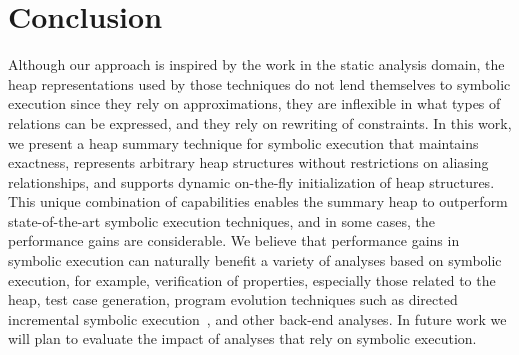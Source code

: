 \section{Conclusion}


Although our approach is inspired by the work in the static analysis
domain, the heap representations used by those techniques do not lend
themselves to symbolic execution since they rely on approximations,
they are inflexible in what types of relations can be expressed, and
they rely on rewriting of constraints.  In this work, we present a
heap summary technique for symbolic execution that maintains
exactness, represents arbitrary heap structures without restrictions
on aliasing relationships, and supports dynamic on-the-fly
initialization of heap structures. This unique combination of
capabilities enables the summary heap to outperform state-of-the-art
symbolic execution techniques, and in some cases, the performance
gains are considerable. We believe that performance gains in symbolic
execution can naturally benefit a variety of analyses based on
symbolic execution, for example, verification of properties,
especially those related to the heap, test case generation, program
evolution techniques such as directed incremental symbolic
execution~\cite{person:pldi2011}, and other back-end analyses. In
future work we will plan to evaluate the impact of analyses that rely
on symbolic execution.

